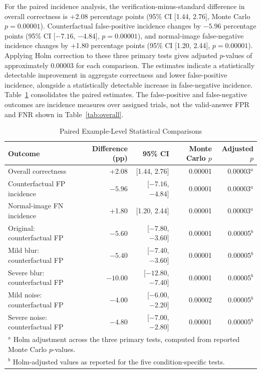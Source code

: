 \documentclass[conference]{IEEEtran}
\begin{document}
For the paired incidence analysis, the verification-minus-standard difference in overall correctness is +2.08 percentage points (95\% CI [1.44, 2.76], Monte Carlo $p=0.00001$). Counterfactual false-positive incidence changes by $-5.96$ percentage points (95\% CI [$-7.16$, $-4.84$], $p=0.00001$), and normal-image false-negative incidence changes by +1.80 percentage points (95\% CI [1.20, 2.44], $p=0.00001$). Applying Holm correction to these three primary tests gives adjusted $p$-values of approximately 0.00003 for each comparison. The estimates indicate a statistically detectable improvement in aggregate correctness and lower false-positive incidence, alongside a statistically detectable increase in false-negative incidence. Table~\ref{tab:pairedstats} consolidates the paired estimates. The false-positive and false-negative outcomes are incidence measures over assigned trials, not the valid-answer FPR and FNR shown in Table~\ref{tab:overall}.

\begin{table}[t]
\caption{Paired Example-Level Statistical Comparisons}
\label{tab:pairedstats}
\centering
\footnotesize
\begin{tabular}{lrrrr}
\toprule
Outcome & Difference (pp) & 95\% CI & Monte Carlo $p$ & Adjusted $p$ \\
\midrule
Overall correctness & +2.08 & [1.44, 2.76] & 0.00001 & 0.00003$^{a}$ \\
Counterfactual FP incidence & $-5.96$ & [$-7.16$, $-4.84$] & 0.00001 & 0.00003$^{a}$ \\
Normal-image FN incidence & +1.80 & [1.20, 2.44] & 0.00001 & 0.00003$^{a}$ \\
Original: counterfactual FP & $-5.60$ & [$-7.80$, $-3.60$] & 0.00001 & 0.00005$^{b}$ \\
Mild blur: counterfactual FP & $-5.40$ & [$-7.40$, $-3.60$] & 0.00001 & 0.00005$^{b}$ \\
Severe blur: counterfactual FP & $-10.00$ & [$-12.80$, $-7.40$] & 0.00001 & 0.00005$^{b}$ \\
Mild noise: counterfactual FP & $-4.00$ & [$-6.00$, $-2.20$] & 0.00002 & 0.00005$^{b}$ \\
Severe noise: counterfactual FP & $-4.80$ & [$-7.00$, $-2.80$] & 0.00001 & 0.00005$^{b}$ \\
\multicolumn{5}{l}{\footnotesize $^{a}$ Holm adjustment across the three primary tests, computed from reported Monte Carlo $p$-values.}\\
\multicolumn{5}{l}{\footnotesize $^{b}$ Holm-adjusted values as reported for the five condition-specific tests.}\\
\bottomrule
\end{tabular}
\end{table}
\end{document}
